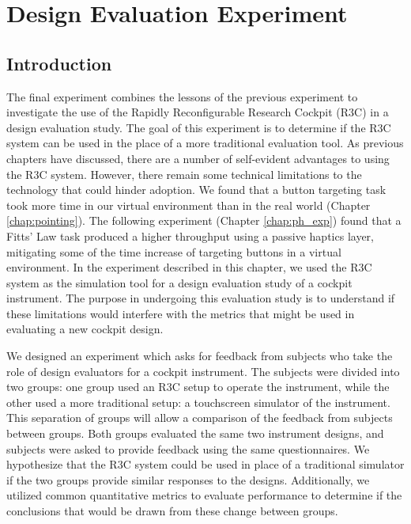 \chapter{Design Evaluation Experiment}
\label{chap:de_exp}

\section{Introduction}

The final experiment combines the lessons of the previous experiment to investigate the use of the Rapidly Reconfigurable Research Cockpit (R3C) in a design evaluation study.
The goal of this experiment is to determine if the R3C system can be used in the place of a more traditional evaluation tool.
As previous chapters have discussed, there are a number of self-evident advantages to using the R3C system.
However, there remain some technical limitations to the technology that could hinder adoption.
We found that a button targeting task took more time in our virtual environment than in the real world (Chapter \ref{chap:pointing}).
The following experiment (Chapter \ref{chap:ph_exp}) found that a Fitts' Law task produced a higher throughput using a passive haptics layer, mitigating some of the time increase of targeting buttons in a virtual environment.
In the experiment described in this chapter, we used the R3C system as the simulation tool for a design evaluation study of a cockpit instrument.
The purpose in undergoing this evaluation study is to understand if these limitations would interfere with the metrics that might be used in evaluating a new cockpit design.

We designed an experiment which asks for feedback from subjects who take the role of design evaluators for a cockpit instrument.
The subjects were divided into two groups: one group used an R3C setup to operate the instrument, while the other used a more traditional setup: a touchscreen simulator of the instrument.
This separation of groups will allow a comparison of the feedback from subjects between groups.
Both groups evaluated the same two instrument designs, and subjects were asked to provide feedback using the same questionnaires.
We hypothesize that the R3C system could be used in place of a traditional simulator if the two groups provide similar responses to the designs.
Additionally, we utilized common quantitative metrics to evaluate performance to determine if the conclusions that would be drawn from these change between groups.

